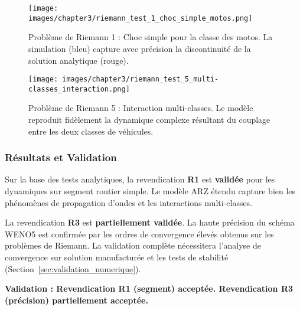 \begin{figure}[htbp]
    \centering
    \texttt{[image: images/chapter3/riemann\_test\_1\_choc\_simple\_motos.png]}
    \caption{Problème de Riemann 1 : Choc simple pour la classe des motos. La simulation (bleu) capture avec précision la discontinuité de la solution analytique (rouge).}
    \label{fig:riemann_choc_simple}
\end{figure}

\begin{figure}[htbp]
    \centering
    \texttt{[image: images/chapter3/riemann\_test\_5\_multi-classes\_interaction.png]}
    \caption{Problème de Riemann 5 : Interaction multi-classes. Le modèle reproduit fidèlement la dynamique complexe résultant du couplage entre les deux classes de véhicules.}
    \label{fig:riemann_interaction_multiclasse}
\end{figure}



\subsubsection{Résultats et Validation}
\label{subsec:resultats_segment}

Sur la base des tests analytiques, la revendication \textbf{R1} est \textbf{validée} pour les dynamiques sur segment routier simple. Le modèle ARZ étendu capture bien les phénomènes de propagation d'ondes et les interactions multi-classes.

La revendication \textbf{R3} est \textbf{partiellement validée}. La haute précision du schéma WENO5 est confirmée par les ordres de convergence élevés obtenus sur les problèmes de Riemann. La validation complète nécessitera l'analyse de convergence sur solution manufacturée et les tests de stabilité (Section~\ref{sec:validation_numerique}).

\textbf{Validation : Revendication R1 (segment) acceptée. Revendication R3 (précision) partiellement acceptée.}

